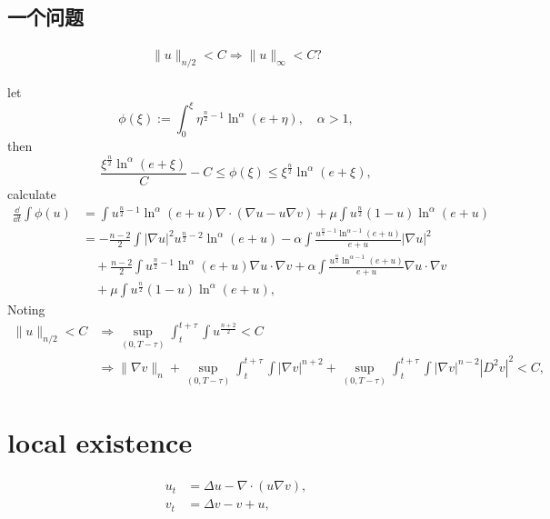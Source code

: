 \subsection{一个问题}
\begin{align*}
	\|u\|_{n/2} < C \Rightarrow \|u\|_\infty < C ?
\end{align*}

let 
\[
	\phi(\xi):= \int_0^\xi \eta^{\frac{n}{2}-1}\ln^{\alpha}(e+\eta), \quad\alpha>1,
\]
then
\[
	\frac{\xi^{\frac{n}{2}}\ln^{\alpha}(e+\xi)}{C} - C 
	\leq \phi(\xi) 
	\leq \xi^{\frac{n}{2}}\ln^{\alpha}(e+\xi),
\]
calculate
\begin{align*}
	\frac{\dd}{\dd t}\int \phi(u) 
	&= \int u^{\frac{n}{2} - 1}\ln^{\alpha}(e+u) \nabla\cdot(\nabla u - u\nabla v)
		+ \mu\int u^{\frac{n}{2}}(1-u)\ln^{\alpha}(e+u)\\
	&= -\frac{n-2}{2}\int |\nabla u|^2u^{\frac{n}{2}-2}\ln^\alpha(e+u)
		- \alpha\int\frac{u^{\frac{n}{2}-1}\ln^{\alpha-1}(e+u)}{e+u}|\nabla u|^2\\
		&\quad + \frac{n-2}{2}\int u^{\frac{n}{2}-1}\ln^\alpha(e+u)\nabla u\cdot\nabla v 
			+ \alpha\int \frac{u^{\frac{n}{2}}\ln^{\alpha-1}(e+u)}{e+u} \nabla u \cdot \nabla v\\
		&\quad + \mu\int u^{\frac{n}{2}}(1-u)\ln^{\alpha}(e+u),
\end{align*}
Noting
\begin{align*}
	\|u\|_{n/2} < C 
	&\Rightarrow \sup_{(0,T-\tau)}\int_t^{t+\tau} \int u^{\frac{n+2}{2}} < C \\
	&\Rightarrow \|\nabla v\|_n 
		+ \sup_{(0,T-\tau)}\int_t^{t+\tau}\int |\nabla v|^{n+2}
		+ \sup_{(0,T-\tau)}\int_t^{t+\tau}\int  |\nabla v|^{n-2}|D^2v|^2 < C,
\end{align*}

\section{local existence}
\begin{align*}
	u_t &= \Delta u - \nabla\cdot(u\nabla v),\\
	v_t &= \Delta v - v + u,
\end{align*}

